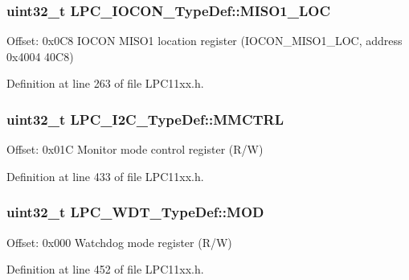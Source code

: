 \subsubsection[{\texorpdfstring{M\+I\+S\+O1\+\_\+\+L\+OC}{MISO1_LOC}}]{ uint32\+\_\+t L\+P\+C\+\_\+\+I\+O\+C\+O\+N\+\_\+\+Type\+Def\+::\+M\+I\+S\+O1\+\_\+\+L\+OC}\hypertarget{group___l_p_c11xx___definitions_ga3aed5efce144c7f27500230e8cbbbf2f}{}\label{group___l_p_c11xx___definitions_ga3aed5efce144c7f27500230e8cbbbf2f}
Offset\+: 0x0\+C8 I\+O\+C\+ON M\+I\+S\+O1 location register (I\+O\+C\+O\+N\+\_\+\+M\+I\+S\+O1\+\_\+\+L\+OC, address 0x4004 40\+C8) 

Definition at line 263 of file L\+P\+C11xx.\+h.

\subsubsection[{\texorpdfstring{M\+M\+C\+T\+RL}{MMCTRL}}]{ uint32\+\_\+t L\+P\+C\+\_\+\+I2\+C\+\_\+\+Type\+Def\+::\+M\+M\+C\+T\+RL}\hypertarget{group___l_p_c11xx___definitions_ga132689ac34ccf6d86dc52216b4c4987c}{}\label{group___l_p_c11xx___definitions_ga132689ac34ccf6d86dc52216b4c4987c}
Offset\+: 0x01C Monitor mode control register (R/W) 

Definition at line 433 of file L\+P\+C11xx.\+h.

\subsubsection[{\texorpdfstring{M\+OD}{MOD}}]{ uint32\+\_\+t L\+P\+C\+\_\+\+W\+D\+T\+\_\+\+Type\+Def\+::\+M\+OD}\hypertarget{group___l_p_c11xx___definitions_ga5112fe2fb4a591ff3310a2eb08e28a47}{}\label{group___l_p_c11xx___definitions_ga5112fe2fb4a591ff3310a2eb08e28a47}
Offset\+: 0x000 Watchdog mode register (R/W) 

Definition at line 452 of file L\+P\+C11xx.\+h.

